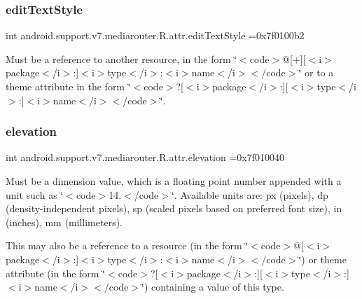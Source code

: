 \subsubsection{\texorpdfstring{edit\+Text\+Style}{editTextStyle}}
{\footnotesize\ttfamily int android.\+support.\+v7.\+mediarouter.\+R.\+attr.\+edit\+Text\+Style =0x7f0100b2\hspace{0.3cm}{\ttfamily [static]}}

Must be a reference to another resource, in the form \char`\"{}$<$code$>$@\mbox{[}+\mbox{]}\mbox{[}$<$i$>$package$<$/i$>$\+:\mbox{]}$<$i$>$type$<$/i$>$\+:$<$i$>$name$<$/i$>$$<$/code$>$\char`\"{} or to a theme attribute in the form \char`\"{}$<$code$>$?\mbox{[}$<$i$>$package$<$/i$>$\+:\mbox{]}\mbox{[}$<$i$>$type$<$/i$>$\+:\mbox{]}$<$i$>$name$<$/i$>$$<$/code$>$\char`\"{}. \mbox{\label{classandroid_1_1support_1_1v7_1_1mediarouter_1_1R_1_1attr_ab1ec64066729d67ab6ae697dc2178d06}} 
\subsubsection{\texorpdfstring{elevation}{elevation}}
{\footnotesize\ttfamily int android.\+support.\+v7.\+mediarouter.\+R.\+attr.\+elevation =0x7f010040\hspace{0.3cm}{\ttfamily [static]}}

Must be a dimension value, which is a floating point number appended with a unit such as \char`\"{}$<$code$>$14.\+5sp$<$/code$>$\char`\"{}. Available units are\+: px (pixels), dp (density-\/independent pixels), sp (scaled pixels based on preferred font size), in (inches), mm (millimeters). 

This may also be a reference to a resource (in the form \char`\"{}$<$code$>$@\mbox{[}$<$i$>$package$<$/i$>$\+:\mbox{]}$<$i$>$type$<$/i$>$\+:$<$i$>$name$<$/i$>$$<$/code$>$\char`\"{}) or theme attribute (in the form \char`\"{}$<$code$>$?\mbox{[}$<$i$>$package$<$/i$>$\+:\mbox{]}\mbox{[}$<$i$>$type$<$/i$>$\+:\mbox{]}$<$i$>$name$<$/i$>$$<$/code$>$\char`\"{}) containing a value of this type. \mbox{\label{classandroid_1_1support_1_1v7_1_1mediarouter_1_1R_1_1attr_a81a698eb10c6fa3e9765f39b03bff723}} 
